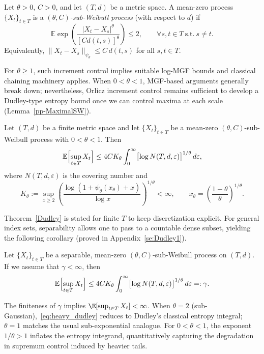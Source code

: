\documentclass[11pt]{article}
\begin{document}
\begin{definition}\label{subWp}
Let $\theta>0$, $C>0$, and let $(T,d)$ be a metric space. A mean-zero process
$\{X_t\}_{t\in T}$ is a \emph{$(\theta,C)$-sub-Weibull process} (with respect to
$d$) if
\[
\mathbb{E}\exp\!\left(\frac{|X_t-X_s|^\theta}{[Cd(t,s)]^\theta}\right)\le 2,
\qquad \forall s,t\in T~\text{s.t.}~s\ne t.
\]
Equivalently, $\|X_t-X_s\|_{\psi_\theta}\le C\,d(t,s)$ for all $s,t\in T$.
\end{definition}

For $\theta\ge 1$, such increment control implies suitable log-MGF bounds and
classical chaining machinery applies.  When $0<\theta<1$, MGF-based arguments
generally break down; nevertheless, Orlicz increment control remains sufficient
to develop a Dudley-type entropy bound once we can control maxima at each scale
(Lemma~\ref{pp-MaximalSW}).

\begin{theorem}\label{Dudley}
Let $(T,d)$ be a finite metric space and let $\{X_t\}_{t\in T}$ be a mean-zero
$(\theta,C)$-sub-Weibull process with $0<\theta<1$. Then
\begin{equation}\label{eq:heavy_dudley}
\mathbb{E}\Bigl[\sup_{t\in T}X_t\Bigr]
\le 4C K_\theta\int_0^\infty \bigl[\log N(T,d,\varepsilon)\bigr]^{1/\theta}\,d\varepsilon,
\end{equation}
where $N(T,d,\varepsilon)$ is the covering number and
\[
K_\theta
:=\sup_{x\ge 2}\left(\frac{\log(1+\psi_\theta(x_\theta)+x)}{\log x}\right)^{1/\theta}
<\infty,
\qquad x_\theta=\left(\frac{1-\theta}{\theta}\right)^{1/\theta}.
\]
\end{theorem}

Theorem~\ref{Dudley} is stated for finite $T$ to keep discretization explicit.
For general index sets, separability allows one to pass to a countable dense
subset, yielding the following corollary (proved in Appendix~\ref{se:Dudley1}).

\begin{corollary}\label{Dudley1}
Let $\{X_t\}_{t\in T}$ be a separable, mean-zero $(\theta,C)$-sub-Weibull process
on $(T,d)$. If we assume that $\gamma<\infty$, then
\[
\mathbb{E}\Bigl[\sup_{t\in T}X_t\Bigr]
\le 4 C K_\theta \int_0^\infty \bigl[\log N(T,d,\varepsilon)\bigr]^{1/\theta}\,d\varepsilon
=: \gamma.
\]
\end{corollary}

The finiteness of $\gamma$ implies $\E[\sup_{t\in T}X_t]<\infty$.  When
$\theta=2$ (sub-Gaussian),~\eqref{eq:heavy_dudley} reduces to Dudley's classical
entropy integral; $\theta=1$ matches the usual sub-exponential analogue.  For
$0<\theta<1$, the exponent $1/\theta>1$ inflates the entropy integrand,
quantitatively capturing the degradation in supremum control induced by heavier
tails.
\end{document}
